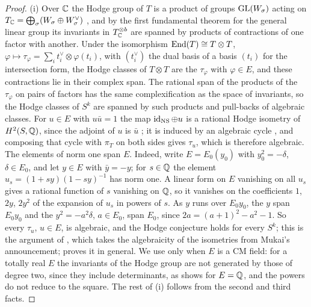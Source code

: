 \begin{proof}
(i) Over $\mathbb{C}$ the Hodge group of $T$ is a product of groups
$\operatorname{GL}(W_{\sigma})$ acting on
$T_{\mathbb{C}}=\bigoplus_{\sigma}(W_{\sigma}\oplus W_{\sigma}^{\vee})$
\cite{Zar83}, and by the first fundamental theorem for the general linear
group \cite[Chapter~5]{GW09} its invariants in $T_{\mathbb{C}}^{\otimes b}$ are
spanned by products of contractions of one factor with another. Under the
isomorphism $\operatorname{End}(T)\cong T\otimes T$, $\varphi\mapsto\tau_{\varphi}=
\sum_{i}t_{i}^{\vee}\otimes\varphi(t_{i})$, with $(t_{i}^{\vee})$ the dual
basis of a basis $(t_{i})$ for the intersection form, the Hodge classes of
$T\otimes T$ are the $\tau_{\varphi}$ with $\varphi\in E$, and these
contractions lie in their complex span. The rational span of the products of
the $\tau_{\varphi}$ on pairs of factors has the same complexification as the
space of invariants, so the Hodge classes of $S^{k}$ are spanned by such
products and pull-backs of algebraic classes. For $u\in E$ with $u\bar u=1$
the map $\operatorname{id}_{\mathrm{NS}}\oplus u$ is a rational Hodge isometry of
$H^{2}(S,\mathbb{Q})$, since the adjoint of $u$ is $\bar u$ \cite{Zar83}; it is
induced by an algebraic cycle \cite{Bus19}, and composing that cycle with
$\pi_{T}$ on both sides gives $\tau_{u}$, which is therefore algebraic. The
elements of norm one span $E$. Indeed, write $E=E_{0}(y_{0})$ with
$y_{0}^{2}=-\delta$, $\delta\in E_{0}$, and let $y\in E$ with $\bar y=-y$; for
$s\in\mathbb{Q}$ the element $u_{s}=(1+sy)(1-sy)^{-1}$ has norm one. A linear form
on $E$ vanishing on all $u_{s}$ gives a rational function of $s$ vanishing on
$\mathbb{Q}$, so it vanishes on the coefficients $1$, $2y$, $2y^{2}$ of the expansion
of $u_{s}$ in powers of $s$. As $y$ runs over $E_{0}y_{0}$, the $y$ span
$E_{0}y_{0}$ and the $y^{2}=-a^{2}\delta$, $a\in E_{0}$, span $E_{0}$, since
$2a=(a+1)^{2}-a^{2}-1$. So every $\tau_{u}$, $u\in E$, is algebraic, and the
Hodge conjecture holds for every $S^{k}$; this is the argument of
\cite[Lemma~5.3, Theorem~5.4]{RM08}, which takes the algebraicity of the
isometries from Mukai's announcement; \cite{Bus19} proves it in general.
We use \cite{RM08} only when $E$ is a CM field: for a totally real $E$ the
invariants of the Hodge group are not generated by those of degree two, since
they include determinants, as  shows for $E=\mathbb{Q}$, and
the powers do not reduce to the square. The rest of (i) follows
from the second and third facts.


\end{proof}
